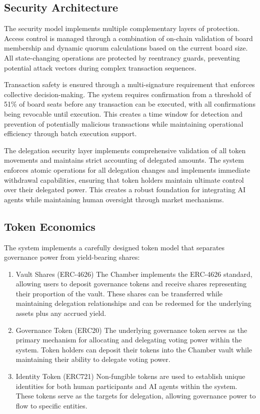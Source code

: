 \documentclass[12pt]{article}
\begin{document}
\subsection{Security Architecture}
The security model implements multiple complementary layers of protection. Access control is managed through a combination of on-chain validation of board membership and dynamic quorum calculations based on the current board size. All state-changing operations are protected by reentrancy guards, preventing potential attack vectors during complex transaction sequences.

Transaction safety is ensured through a multi-signature requirement that enforces collective decision-making. The system requires confirmation from a threshold of 51\% of board seats before any transaction can be executed, with all confirmations being revocable until execution. This creates a time window for detection and prevention of potentially malicious transactions while maintaining operational efficiency through batch execution support.

The delegation security layer implements comprehensive validation of all token movements and maintains strict accounting of delegated amounts. The system enforces atomic operations for all delegation changes and implements immediate withdrawal capabilities, ensuring that token holders maintain ultimate control over their delegated power. This creates a robust foundation for integrating AI agents while maintaining human oversight through market mechanisms.

\subsection{Token Economics}
The system implements a carefully designed token model that separates governance power from yield-bearing shares:

\begin{enumerate}
    \item Vault Shares (ERC-4626)
    The Chamber implements the ERC-4626 standard, allowing users to deposit governance tokens and receive shares representing their proportion of the vault. These shares can be transferred while maintaining delegation relationships and can be redeemed for the underlying assets plus any accrued yield.
    
    \item Governance Token (ERC20)
    The underlying governance token serves as the primary mechanism for allocating and delegating voting power within the system. Token holders can deposit their tokens into the Chamber vault while maintaining their ability to delegate voting power.
    
    \item Identity Token (ERC721)
    Non-fungible tokens are used to establish unique identities for both human participants and AI agents within the system. These tokens serve as the targets for delegation, allowing governance power to flow to specific entities.
\end{enumerate}
\end{document}
